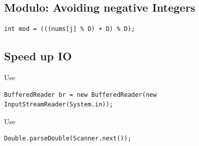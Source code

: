 \documentclass[10pt,a4paper,ngerman,oneside,]{article}
\begin{document}
\begin{multicols}{2}
\subsection{Modulo: Avoiding negative Integers}
\begin{lstlisting}
int mod = (((nums[j] % D) + D) % D);
\end{lstlisting}

\subsection{Speed up IO}
Use
\begin{lstlisting}
BufferedReader br = new BufferedReader(new
InputStreamReader(System.in));
\end{lstlisting}
Use
\begin{lstlisting}
Double.parseDouble(Scanner.next());
\end{lstlisting}
\end{multicols}


%
\end{document}
